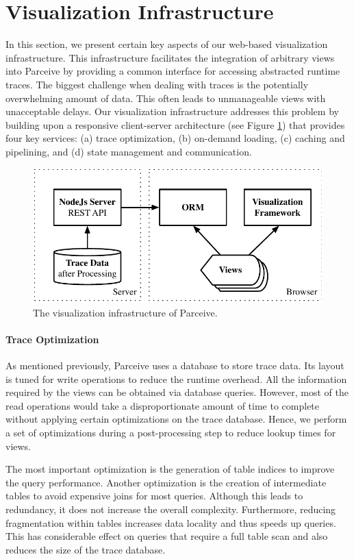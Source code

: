 \section{Visualization Infrastructure}
In this section, we present certain key aspects of our web-based visualization
infrastructure. This infrastructure facilitates the integration of arbitrary
views into Parceive by providing a common interface for accessing abstracted
runtime traces. The biggest challenge when dealing with traces is the
potentially overwhelming amount of data. This often leads to unmanageable views
with unacceptable delays. Our visualization infrastructure addresses this
problem by building upon a responsive client-server architecture (see Figure
\ref{fig:visualization}) that provides four key services: (a) trace
optimization, (b) on-demand loading, (c) caching and pipelining, and (d)
state management and communication.

\begin{figure}[h!]
\includegraphics[width=\linewidth]{img/visualization_framework}
\caption{The visualization infrastructure of Parceive.}
\label{fig:visualization}
\end{figure}

\paragraph{Trace Optimization}
As mentioned previously, Parceive uses a database to store trace data. Its
layout is tuned for write operations to reduce the runtime overhead. All the
information required by the views can be obtained via database queries.
However, most of the read operations would take a disproportionate amount of
time to complete without applying certain optimizations on the trace database.
Hence, we perform a set of optimizations during a post-processing step to
reduce lookup times for views.

The most important optimization is the generation of table indices to improve
the query performance. Another optimization is the creation of intermediate
tables to avoid expensive joins for most queries. Although this leads to
redundancy, it does not increase the overall complexity. Furthermore, reducing
fragmentation within tables increases data locality and thus speeds up queries.
This has considerable effect on queries that require a full table scan and also
reduces the size of the trace database.

